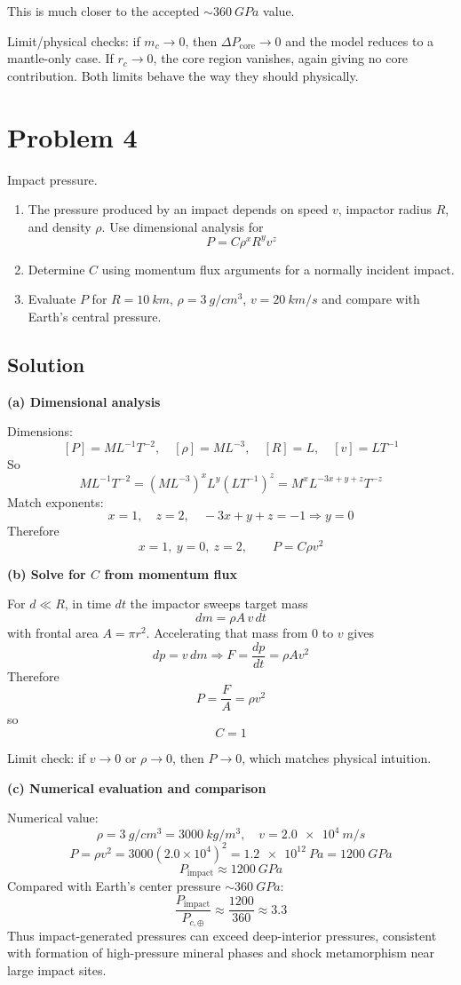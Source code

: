 \documentclass[11pt]{article}
\begin{document}
This is much closer to the accepted $\sim\SI{360}{GPa}$ value.

Limit/physical checks:
if $m_c\to0$, then $\Delta P_{\mathrm{core}}\to0$ and the model reduces to a mantle-only case.
If $r_c\to0$, the core region vanishes, again giving no core contribution.
Both limits behave the way they should physically.

\newpage
\section*{Problem 4}
Impact pressure.
\begin{enumerate}[label=(\alph*)]
\item The pressure produced by an impact depends on speed $v$, impactor radius $R$, and density
$\rho$. Use dimensional analysis for
\[
P=C\rho^xR^yv^z
\]
\item Determine $C$ using momentum flux arguments for a normally incident impact.
\item Evaluate $P$ for $R=\SI{10}{km}$, $\rho=\SI{3}{g/cm^3}$,
$v=\SI{20}{km/s}$ and compare with Earth's central pressure.
\end{enumerate}

\subsection*{Solution}
\textbf{(a) Dimensional analysis}

Dimensions:
\[
[P]=M L^{-1}T^{-2},\quad [\rho]=ML^{-3},\quad [R]=L,\quad [v]=LT^{-1}
\]
So
\[
ML^{-1}T^{-2}=(ML^{-3})^xL^y(LT^{-1})^z
=M^xL^{-3x+y+z}T^{-z}
\]
Match exponents:
\[
x=1,\quad z=2,\quad -3x+y+z=-1\Rightarrow y=0
\]
Therefore
\[
\boxed{x=1,\ y=0,\ z=2},\qquad P=C\rho v^2
\]

\textbf{(b) Solve for $C$ from momentum flux}

For $d\ll R$, in time $dt$ the impactor sweeps target mass
\[
dm=\rho A\,v\,dt
\]
with frontal area $A=\pi r^2$.
Accelerating that mass from $0$ to $v$ gives
\[
d p = v\,dm \Rightarrow
F=\frac{dp}{dt}=\rho A v^2
\]
Therefore
\[
P=\frac{F}{A}=\rho v^2
\]
so
\[
\boxed{C=1}
\]

Limit check:
if $v\to0$ or $\rho\to0$, then $P\to0$, which matches physical intuition.

\textbf{(c) Numerical evaluation and comparison}

Numerical value:
\[
\rho=\SI{3}{g/cm^3}=\SI{3000}{kg/m^3},\quad v=\SI{2.0e4}{m/s}
\]
\[
P=\rho v^2=3000(2.0\times10^4)^2
=\SI{1.2e12}{Pa}=\SI{1200}{GPa}
\]
\[
\boxed{P_{\mathrm{impact}}\approx\SI{1200}{GPa}}
\]
Compared with Earth's center pressure $\sim\SI{360}{GPa}$:
\[
\frac{P_{\mathrm{impact}}}{P_{c,\oplus}}\approx\frac{1200}{360}\approx3.3
\]
Thus impact-generated pressures can exceed deep-interior pressures, consistent with formation
of high-pressure mineral phases and shock metamorphism near large impact sites.
\end{document}
